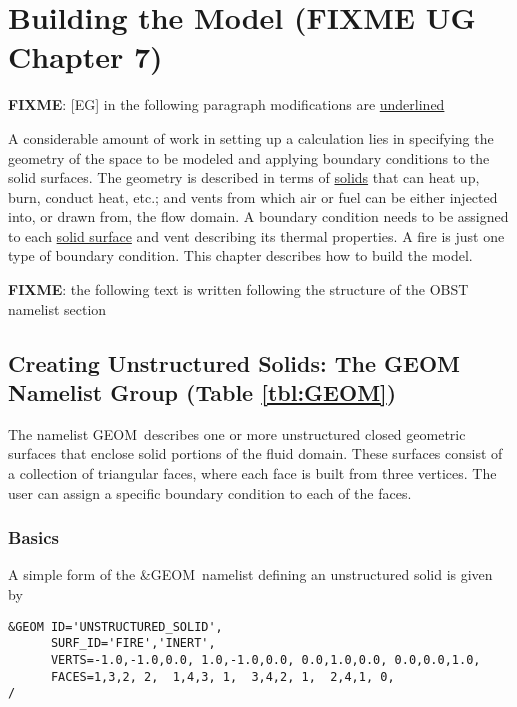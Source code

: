 \documentclass[12pt]{article}
\begin{document}


\vspace{1.0in}

\chapter{Building the Model (FIXME UG Chapter 7)}

\textbf{FIXME}: [EG] in the following paragraph modifications are \underline{underlined}

A considerable amount of work in setting up a calculation lies in specifying the geometry of the space to
be modeled and applying boundary conditions to the solid surfaces. The geometry is described in terms of
\underline{solids} that can heat up, burn, conduct heat, etc.; and vents from which air or fuel can be
either injected into, or drawn from, the flow domain. A boundary condition needs to be assigned to each
\underline{solid surface} and vent describing its thermal properties. A fire is just one type of boundary condition.
This chapter describes how to build the model.

\textbf{FIXME}: the following text is written following the structure of the {\ct OBST} namelist section

\section{Creating Unstructured Solids: The \texorpdfstring{{\ct GEOM}}{GEOM} Namelist Group (Table \ref{tbl:GEOM})}
\label{info:GEOM}

The namelist {\ct GEOM}\ describes one or more unstructured closed geometric surfaces that enclose solid portions
of the fluid domain. These surfaces consist of a collection of triangular faces, where each face is built
from three vertices. The user can assign a specific boundary condition to each of the faces.

\subsection{Basics}
\label{info:GEOM_Basics}

A simple form of the {\ct \&GEOM}\ namelist defining an unstructured solid is given by

\begin{verbatim}
&GEOM ID='UNSTRUCTURED_SOLID',
      SURF_ID='FIRE','INERT',
      VERTS=-1.0,-1.0,0.0, 1.0,-1.0,0.0, 0.0,1.0,0.0, 0.0,0.0,1.0,
      FACES=1,3,2, 2,  1,4,3, 1,  3,4,2, 1,  2,4,1, 0,  
/
\end{verbatim}
\end{document}
